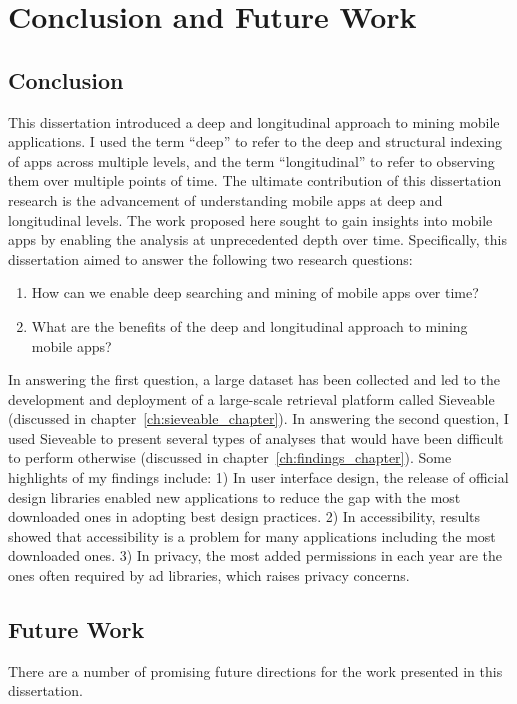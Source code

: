 \chapter{Conclusion and Future Work}
\label{ch:conclusion}

\section{Conclusion}
This dissertation introduced a deep and longitudinal approach to mining mobile applications.
I used the term ``deep'' to refer to the deep and structural indexing of apps across multiple levels, and the term ``longitudinal'' to refer to observing them over multiple points of time.
The ultimate contribution of this dissertation research is the advancement of understanding mobile apps at deep and longitudinal levels.
The work proposed here sought to gain insights into mobile apps by enabling the analysis at unprecedented depth over time.
Specifically, this dissertation aimed to answer the following two research questions:
\begin{enumerate}
	\item How can we enable deep searching and mining of mobile apps over time?
	\item What are the benefits of the deep and longitudinal approach to mining mobile apps?
\end{enumerate}
In answering the first question, a large dataset has been collected and led to the development and deployment of a large-scale retrieval platform called Sieveable (discussed in chapter~\ref{ch:sieveable_chapter}).
In answering the second question, I used Sieveable to present several types of analyses that would have been difficult to perform otherwise  (discussed in chapter~\ref{ch:findings_chapter}).
Some highlights of my findings include:
1) In user interface design, the release of official design libraries enabled new applications to reduce the gap with the most downloaded ones in adopting best design practices.
2) In accessibility, results showed that accessibility is a problem for many applications including the most downloaded ones.
3) In privacy, the most added permissions in each year are the ones often required by ad libraries, which raises privacy concerns.

\section{Future Work}
There are a number of promising future directions for the work presented in this dissertation.

